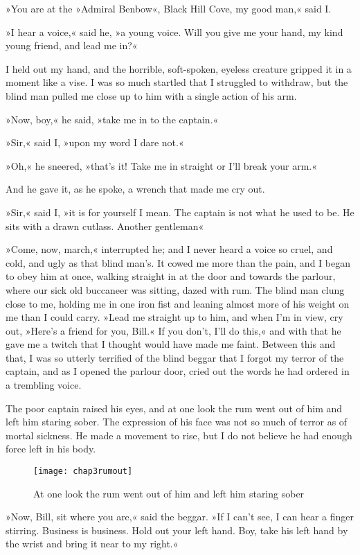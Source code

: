 »You are at the »Admiral Benbow«, Black Hill Cove, my good man,« said I.

»I hear a voice,« said he, »a young voice. Will you give me your hand, my kind young friend, and lead me in?«

I held out my hand, and the horrible, soft-spoken, eyeless creature gripped it in a moment like a vise. I was so much startled that I struggled to withdraw, but the blind man pulled me close up to him with a single action of his arm.

»Now, boy,« he said, »take me in to the captain.«

»Sir,« said I, »upon my word I dare not.«

»Oh,« he sneered, »that's it! Take me in straight or I'll break your arm.«

And he gave it, as he spoke, a wrench that made me cry out.

»Sir,« said I, »it is for yourself I mean. The captain is not what he used to be. He sits with a drawn cutlass. Another gentleman\longdash«

»Come, now, march,« interrupted he; and I never heard a voice so cruel, and cold, and ugly as that blind man's. It cowed me more than the pain, and I began to obey him at once, walking straight in at the door and towards the parlour, where our sick old buccaneer was sitting, dazed with rum. The blind man clung close to me, holding me in one iron fist and leaning almost more of his weight on me than I could carry. »Lead me straight up to him, and when I'm in view, cry out, »Here's a friend for you, Bill.« If you don't, I'll do this,« and with that he gave me a twitch that I thought would have made me faint. Between this and that, I was so utterly terrified of the blind beggar that I forgot my terror of the captain, and as I opened the parlour door, cried out the words he had ordered in a trembling voice.


The poor captain raised his eyes, and at one look the rum went out of him and left him staring sober. The expression of his face was not so much of terror as of mortal sickness. He made a movement to rise, but I do not believe he had enough force left in his body.

\begin{sidewaysfigure}
\texttt{[image: chap3rumout]}%
\caption[The rum went out of him]{At one look the rum went out of him and left him staring sober}
\end{sidewaysfigure}

»Now, Bill, sit where you are,« said the beggar. »If I can't see, I can hear a finger stirring. Business is business. Hold out your left hand. Boy, take his left hand by the wrist and bring it near to my right.«

